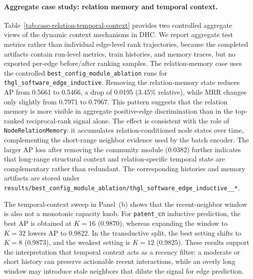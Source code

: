 \paragraph{Aggregate case study: relation memory and temporal context.}
Table~\ref{tab:case-relation-temporal-context} provides two controlled aggregate views of the dynamic context mechanisms in DHC. We report aggregate test metrics rather than individual edge-level rank trajectories, because the completed artifacts contain run-level metrics, train histories, and memory traces, but no exported per-edge before/after ranking samples. The relation-memory case uses the controlled \texttt{best\_config\_module\_ablation} runs for \texttt{thgl\_software\_edge\_inductive}. Removing the relation-memory state reduces AP from 0.5661 to 0.5466, a drop of 0.0195 (3.45\% relative), while MRR changes only slightly from 0.7971 to 0.7967. This pattern suggests that the relation memory is more visible in aggregate positive-edge discrimination than in the top-ranked reciprocal-rank signal alone. The effect is consistent with the role of \texttt{NodeRelationMemory}: it accumulates relation-conditioned node states over time, complementing the short-range neighbor evidence used by the batch encoder. The larger AP loss after removing the community module (0.0382) further indicates that long-range structural context and relation-specific temporal state are complementary rather than redundant. The corresponding histories and memory artifacts are stored under \texttt{results/best\_config\_module\_ablation/thgl\_software\_edge\_inductive\_\_*}.

The temporal-context sweep in Panel~(b) shows that the recent-neighbor window is also not a monotonic capacity knob. For \texttt{patent\_cn} inductive prediction, the best AP is obtained at $K=16$ (0.9870), whereas expanding the window to $K=32$ lowers AP to 0.9822. In the transductive split, the best setting shifts to $K=8$ (0.9873), and the weakest setting is $K=12$ (0.9825). These results support the interpretation that temporal context acts as a recency filter: a moderate or short history can preserve actionable recent interactions, while an overly long window may introduce stale neighbors that dilute the signal for edge prediction.

